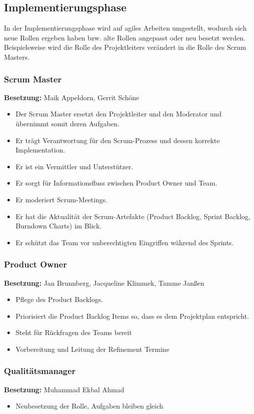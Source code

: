 \subsection{Implementierungsphase}
In der Implementierungsphase wird auf agiles Arbeiten umgestellt, wodurch sich neue Rollen ergeben haben bzw. alte Rollen angepasst oder neu besetzt werden. Beispielsweise wird die Rolle des Projektleiters verändert in die Rolle des Scrum Masters.

\subsubsection{Scrum Master}
\textbf{Besetzung:} Maik Appeldorn, Gerrit Schöne \\
\begin{itemize}
	\item Der Scrum Master ersetzt den Projektleiter und den Moderator und übernimmt somit deren Aufgaben.
	\item Er trägt Verantwortung für den Scrum-Prozess und dessen korrekte Implementation.
	\item Er ist ein Vermittler und Unterstützer.
	\item Er sorgt für Informationsfluss zwischen Product Owner und Team.
	\item Er moderiert Scrum-Meetings.
	\item Er hat die Aktualität der Scrum-Artefakte (Product Backlog, Sprint Backlog, Burndown Charts) im Blick.
	\item Er schützt das Team vor unberechtigten Eingriffen während des Sprints.
\end{itemize}
\subsubsection{Product Owner}
\textbf{Besetzung:} Jan Brunnberg, Jacqueline Klimmek, Tamme Janßen \\
\begin{itemize}
	\item Pflege des Product Backlogs.
	\item Priorisiert die Product Backlog Items so, dass es dem Projektplan entspricht.
	\item Steht für Rückfragen des Teams bereit
	\item Vorbereitung und Leitung der Refinement Termine
\end{itemize}
\subsubsection{Qualitätsmanager}
\textbf{Besetzung:} Muhammad Ekbal Ahmad \\
\begin{itemize}
	\item Neubesetzung der Rolle, Aufgaben bleiben gleich 
\end{itemize}
